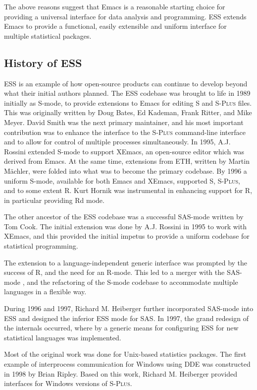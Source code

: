 \documentclass{article}
\newcommand*{\Splus}{\textsc{S-Plus}}
\begin{document}
The above reasons suggest that Emacs is a reasonable starting choice
for providing a universal interface for data analysis and programming.
ESS extends Emacs to provide a functional, easily extensible and
uniform interface for multiple statistical packages.

\subsection{History of ESS}
\label{sec:ESS:history}

ESS is an example of how open-source products can continue to develop
beyond what their initial authors planned.  The ESS codebase was brought
to life in 1989 initially as S-mode, to provide extensions to Emacs for
editing S and \Splus{} files.  This was originally written by Doug
Bates, Ed Kademan, Frank Ritter, and Mike Meyer.  David Smith was the
next primary maintainer, and his most important contribution was to
enhance the interface to the \Splus{} command-line interface and to
allow for control of multiple processes simultaneously.  In 1995, A.J.
Rossini extended S-mode to support XEmacs, an open-source editor which
was derived from Emacs.  At the same time, extensions from ETH, written
by Martin M{\"a}chler, were folded into what was to become the primary
codebase.  By 1996 a uniform S-mode, available for both Emacs and
XEmacs, supported S, \Splus, and to some extent R.  Kurt Hornik was
instrumental in enhancing support for R, in particular providing Rd
mode.

The other ancestor of the ESS codebase was a successful SAS-mode
written by Tom Cook.  The initial extension was done by A.J. Rossini
in 1995 to work with XEmacs, and this provided the initial impetus to
provide a uniform codebase for statistical programming.

The extension to a language-independent generic interface was prompted
by the success of R, and the need for an R-mode.  This led to a merger
with the SAS-mode \citep{SASMODE}, and the refactoring of the S-mode
codebase to accommodate multiple languages in a flexible way.

During 1996 and 1997, Richard M. Heiberger further incorporated
SAS-mode into ESS and designed the inferior ESS mode for SAS.  In
1997, the grand redesign of the internals occurred, where by a generic
means for configuring ESS for new statistical languages was
implemented.

Most of the original work was done for Unix-based statistics packages.
The first example of interprocess communication for Windows using DDE
was constructed in 1998 by Brian Ripley.  Based on this work, Richard
M. Heiberger provided interfaces for Windows versions of \Splus.
\end{document}
